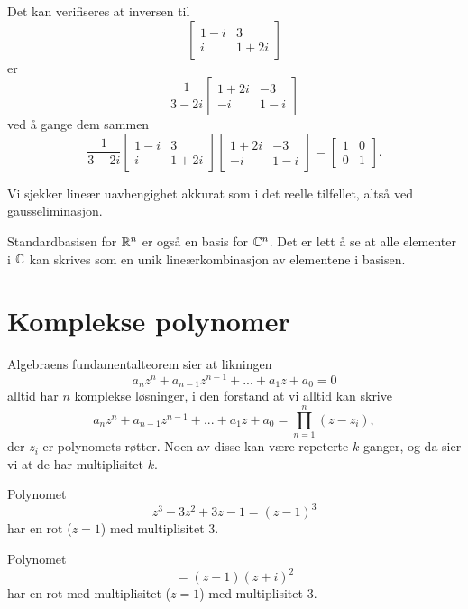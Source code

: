 \begin{ex}
Det kan verifiseres at inversen til 
\[
\begin{bmatrix}
1-i & 3  \\ i &1+2i 
\end{bmatrix}
\]
er
\[
\frac{1}{3-2i}
\begin{bmatrix}
1+2i & -3  \\ -i &1-i 
\end{bmatrix}
\]
ved å gange dem sammen
\[
\frac{1}{3-2i}
\begin{bmatrix}
1-i & 3  \\ i &1+2i 
\end{bmatrix}
\begin{bmatrix}
1+2i & -3  \\ -i &1-i 
\end{bmatrix}
=
\begin{bmatrix}
1 & 0  \\ 0 &1 
\end{bmatrix}.
\]


\end{ex}

\begin{ex}
Vi sjekker lineær uavhengighet akkurat som i det reelle tilfellet, altså ved gausseliminasjon.
\end{ex}

\begin{ex}
Standardbasisen for $\mathbb{R}^n$ er også en basis for $\mathbb{C}^n$. Det er lett å se at alle elementer i $\mathbb{C}$ kan skrives som en unik lineærkombinasjon av elementene i basisen.
\end{ex}



\section*{Komplekse polynomer}

Algebraens fundamentalteorem sier at likningen
\[
a_nz^n+a_{n-1}z^{n-1}+...+a_1z+a_0=0
\]
alltid har $n$ komplekse løsninger, i den forstand at vi alltid kan skrive
\[
a_nz^n+a_{n-1}z^{n-1}+...+a_1z+a_0=\prod_{n=1}^n (z-z_i),
\]
der $z_i$ er polynomets røtter. Noen av disse kan være repeterte $k$ ganger, og da sier vi at de har multiplisitet $k$. 

\begin{ex}
Polynomet 
\[
z^3-3z^2+3z-1=(z-1)^3
\]
har en rot ($z=1$) med multiplisitet 3.
\end{ex}

\begin{ex}
Polynomet 
\[
=(z-1)(z+i)^2
\]
har en rot med multiplisitet ($z=1$) med multiplisitet 3.
\end{ex}

